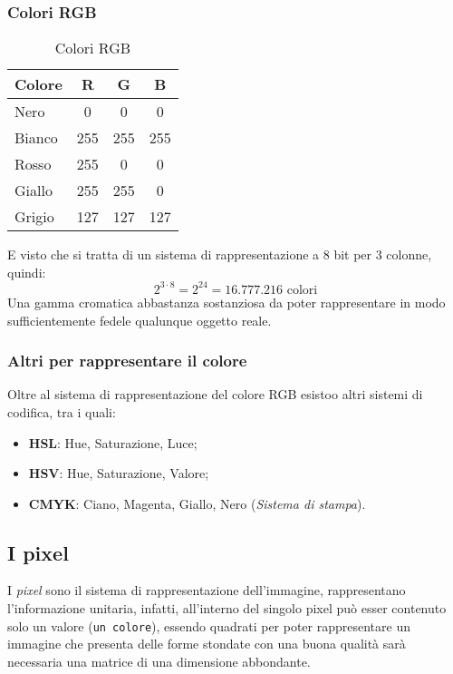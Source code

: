\documentclass{report}
\begin{document}
\subsubsection{Colori RGB}
\label{sec:rgbcolor}
\begin{table}[ht!]
  \centering
  \begin{tabular}{lccc}
    \textbf{Colore}& \textbf{R} & \textbf{G} & \textbf{B}\\\hline
    Nero & 0 & 0 & 0\\
    Bianco & 255 & 255 & 255\\
    {\color{red}Rosso} & 255 & 0 & 0\\
    {\color{yellow}Giallo} & 255 & 255 & 0\\
    {\color{gray}Grigio} & 127 & 127 & 127\\\hline
  \end{tabular}
  \caption{Colori RGB}
  \label{tab:rgb}
\end{table}
E visto che si tratta di un sistema di rappresentazione a 8 bit per 3
colonne, quindi:
\begin{equation*}
  2^{3\cdot 8} =2^{24} = 16.777.216 \text{ colori}
\end{equation*}
Una gamma cromatica abbastanza sostanziosa da poter rappresentare in modo
sufficientemente fedele qualunque oggetto reale.

\subsubsection{Altri per rappresentare il colore}
\label{sec:altcolorr}

Oltre al sistema di rappresentazione del colore RGB esistoo altri sistemi
di codifica, tra i quali:
\begin{itemize}
\item \textbf{HSL}: Hue, Saturazione, Luce;
\item \textbf{HSV}: Hue, Saturazione, Valore;
\item \textbf{CMYK}: Ciano, Magenta, Giallo, Nero (\textit{Sistema di
    stampa}).
\end{itemize}

\subsection{I pixel}
\label{sec:pixel}

I \textit{pixel} sono il sistema di rappresentazione dell'immagine,
rappresentano l'informazione unitaria, infatti, all'interno del singolo
pixel può esser contenuto solo un valore (\texttt{un colore}), essendo
quadrati per poter rappresentare un immagine che presenta delle forme
stondate con una buona qualità sarà necessaria una matrice di una
dimensione abbondante.
\end{document}
